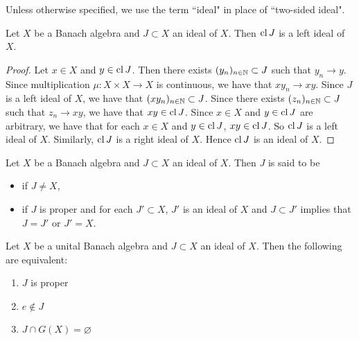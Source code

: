 \documentclass{book}
\begin{document}
	\begin{note}
		Unless otherwise specified, we use the term ``ideal" in place of ``two-sided ideal".
	\end{note}

	\begin{ex}
		Let $X$ be a Banach algebra and $J \subset X$ an ideal of $X$. Then $\operatorname{cl} J$ is a left ideal of $X$.
	\end{ex}

	\begin{proof}
		Let $x \in X$ and $y \in \operatorname{cl} J$. Then there exists $(y_n)_{n \in \mathbb{N}} \subset J$ such that $y_n \rightarrow y$. Since multiplication $\mu: X \times X \rightarrow X$ is continuous, we have that $x y_n \rightarrow xy$.  Since $J$ is a left ideal of $X$, we have that $(xy_n)_{n \in \mathbb{N}} \subset J$. Since there exists $(z_n)_{n \in \mathbb{N}} \subset J$ such that $z_n \rightarrow xy$, we have that $xy \in \operatorname{cl} J$. Since $x \in X$ and $y \in \operatorname{cl} J$ are arbitrary, we have that for each $x \in X$ and $y \in \operatorname{cl} J$, $xy \in \operatorname{cl} J$. So $\operatorname{cl} J$ is a left ideal of $X$. Similarly, $\operatorname{cl} J$ is a right ideal of $X$. Hence $\operatorname{cl} J$ is an ideal of $X$.
	\end{proof}

	\begin{defn}
		Let $X$ be a Banach algebra and $J \subset X$ an ideal of $X$. Then $J$ is said to be
		\begin{itemize}
			\item {} if $J \neq X$,
			\item {} if $J$ is proper and for each $J' \subset X$, $J'$ is an ideal of $X$ and $J \subset J'$ implies that $J = J'$ or $J' = X$.
		\end{itemize}
	\end{defn}

	\begin{ex}
		Let $X$ be a unital Banach algebra and $J \subset X$ an ideal of $X$. Then the following are equivalent:
		\begin{enumerate}
			\item $J$ is proper
			\item $e \not \in J$
			\item $J \cap G(X) = \varnothing$
		\end{enumerate}
	\end{ex}
\end{document}
